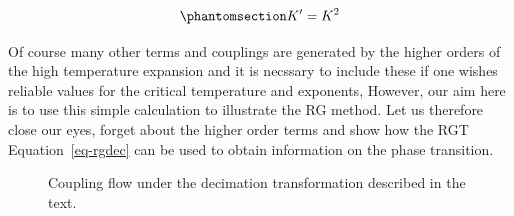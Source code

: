 \documentclass[
  letterpaper,
  enabledeprecatedfontcommands]{report}
\begin{document}
\begin{equation}\phantomsection\label{eq-rgdec}{
K^\prime=K^2
}\end{equation}

Of course many other terms and couplings are generated by the higher
orders of the high temperature expansion and it is necssary to include
these if one wishes reliable values for the critical temperature and
exponents, However, our aim here is to use this simple calculation to
illustrate the RG method. Let us therefore close our eyes, forget about
the higher order terms and show how the RGT Equation~\ref{eq-rgdec} can
be used to obtain information on the phase transition.

\begin{figure}


\caption{\label{fig-flow1}Coupling flow under the decimation
transformation described in the text.}

\end{figure}%
\end{document}
